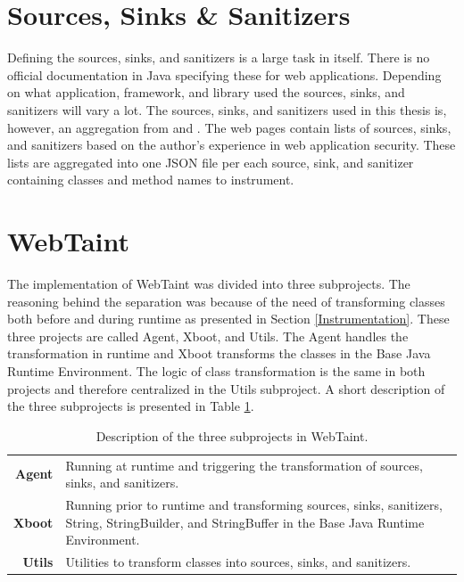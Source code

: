 \section{Sources, Sinks \& Sanitizers}
\label{souresSS}
Defining the sources, sinks, and sanitizers is a large task in itself. There is no official documentation in Java specifying these for web applications. Depending on what application, framework, and library used the sources, sinks, and sanitizers will vary a lot. The sources, sinks, and sanitizers used in this thesis is, however, an aggregation from \textcite{sssCodeMaster} and \textcite{sssOWASP}. The web pages contain lists of sources, sinks, and sanitizers based on the author's experience in web application security. These lists are aggregated into one JSON file per each source, sink, and sanitizer containing classes and method names to instrument.



\section{WebTaint}
\label{SoftwareArchitecture}
The implementation of WebTaint was divided into three subprojects. The reasoning behind the separation was because of the need of transforming classes both before and during runtime as presented in Section \ref{Instrumentation}. These three projects are called Agent, Xboot, and Utils. The Agent handles the transformation in runtime and Xboot transforms the classes in the Base Java Runtime Environment. The logic of class transformation is the same in both projects and therefore centralized in the Utils subproject. A short description of the three subprojects is presented in Table \ref{table:subprojects}.

\begin{table}[H]
    \centering
    \caption{Description of the three subprojects in WebTaint.}
    \label{table:subprojects}
    \begin{tabular}{rp{10cm}}
        \textbf{Agent} & Running at runtime and triggering the transformation of sources, sinks, and sanitizers. \\
        \textbf{Xboot} & Running prior to runtime and transforming sources, sinks, sanitizers, String, StringBuilder, and StringBuffer in the Base Java Runtime Environment. \\
        \textbf{Utils} & Utilities to transform classes into sources, sinks, and sanitizers. \\
    \end{tabular}
\end{table}

